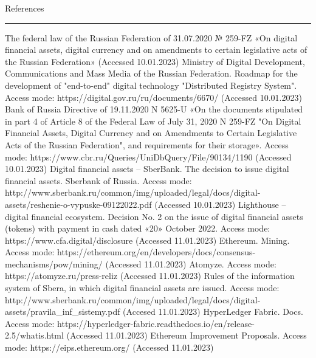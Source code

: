 \vspace{\baselineskip}

References
\vspace{3pt}
\hrule height 2pt
\renewcommand{\refname}{}
\vspace{-\baselineskip}
\begin{thebibliography}{10}
	 The federal law of the Russian Federation of 31.07.2020 № 259-FZ «On digital financial assets, digital currency and on amendments to certain legislative acts of the Russian Federation» (Accessed 10.01.2023)
	 Ministry of Digital Development, Communications and Mass Media of the Russian Federation. Roadmap for the development of "end-to-end" digital technology "Distributed Registry System". Access mode: https://digital.gov.ru/ru/documents/6670/ (Accessed 10.01.2023)
	 Bank of Russia Directive of 19.11.2020 N 5625-U «On the documents stipulated in part 4 of Article 8 of the Federal Law of July 31, 2020 N 259-FZ "On Digital Financial Assets, Digital Currency and on Amendments to Certain Legislative Acts of the Russian Federation", and requirements for their storage». Access mode: https://www.cbr.ru/Queries/UniDbQuery/File/90134/1190 (Accessed 10.01.2023)
	 Digital financial assets – SberBank. The decision to issue digital financial assets. Sberbank of Russia. Access mode: http://www.sberbank.ru/common/img/uploaded/legal/docs/digital-assets/reshenie-o-vypuske-09122022.pdf (Accessed 10.01.2023)
	 Lighthouse – digital financial ecosystem. Decision No. 2 on the issue of digital financial assets (tokens) with payment in cash dated «20» October 2022. Access mode: https://www.cfa.digital/disclosure (Accessed 11.01.2023)
	 Ethereum. Mining. Access mode: https://ethereum.org/en/developers/docs/consensus-mechanisms/pow/mining/ (Accessed 11.01.2023)
	 Atomyze. Access mode: https://atomyze.ru/press-reliz (Accessed 11.01.2023)
	 Rules of the information system of Sbera, in which digital financial assets are issued. Access mode: http://www.sberbank.ru/common/img/uploaded/legal/docs/digital-assets/pravila\_inf\_sistemy.pdf (Accesed 11.01.2023)
	 HyperLedger Fabric. Docs. Access mode: https://hyperledger-fabric.readthedocs.io/en/release-2.5/whatis.html (Accessed 11.01.2023)
	 Ethereum Improvement Proposals. Access mode: https://eips.ethereum.org/ (Accessed 11.01.2023)
\end{thebibliography}